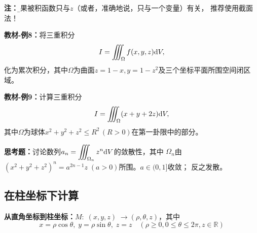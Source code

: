 \begin{center}
\end{center}

{\bf 注：}{\b 如果被积函数只与$z$（或者，准确地说，只与一个变量）有关，
推荐使用截面法！}

{\bf 教材-例8：}将三重积分
$$I=\iiint_{\Omega}f(x,y,z)\mathrm{d} V,$$
化为累次积分，其中$\Omega$为曲面$z=1-x,y=1-z^2$及三个坐标平面所围空间闭区域。

{\bf 教材-例9：}计算三重积分
$$I=\iiint_{\Omega}(x+y+2z)\mathrm{d} V,$$
其中$\Omega$为球体$x^2+y^2+z^2\leq R^2\,(R>0)$在第一卦限中的部分。

{\bf 思考题：}讨论数列$a_n=\displaystyle\iiint_{\Omega_n}z^n\mathrm{d} V$的敛散性，其中
$\Omega_n$由$(x^2+y^2+z^2)^n=a^{2n-1}z\;(a>0)$所围。\hfill $a\in(0,1]$收敛；
反之发散。

\subsection{在柱坐标下计算}

{\bf 从直角坐标到柱坐标：}$M:\;(x,y,z)\;\to(\rho,\theta,z)$，其中
$$x=\rho\cos\theta,\;y=\rho\sin\theta,\;z=z\quad (\rho\geq 0,0\leq\theta\leq
2\pi,z\in\mathbb{R})$$

